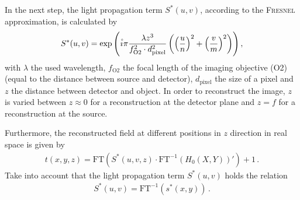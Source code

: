 \documentclass{article}
\newcommand{\ima}[0]{\overset{\hspace{0.5mm}\text{\scalebox{0.7}{$\circ$}}}{\imath}}
\begin{document}
In the next step, the light propagation term $S^*(u,v)$, according to the \textsc{Fresnel} approximation, is calculated by
\begin{align}
    S^*(u,v)=\exp{\left( \ima \pi \frac{\lambda z^3}{f_\text{O2}^2 \cdot d_\text{pixel}^2} \left( \left(\frac{u}{n}\right)^2+\left(\frac{v}{m}\right)^2\right)\right)}\,, \label{eq:propagator}
\end{align}
with $\lambda$ the used wavelength, $f_\text{O2}$ the focal length of the imaging objective (O2) (equal to the distance between source and detector), $d_\text{pixel}$ the size of a pixel and $z$ the distance between detector and object. In order to reconstruct the image, $z$ is varied between $z\approx0$ for a reconstruction at the detector plane and $z=f$ for a reconstruction at the source.

Furthermore, the reconstructed field at different positions in $z$ direction in real space is given by 
\begin{align}
    t(x,y,z)=\text{FT}\left( S^*(u,v,z) \cdot \text{FT}^{-1}\left(H_0(X,Y)\right)'\right)+1\,. \label{eq:field1}
\end{align}
Take into account that the light propagation term $S^*(u,v)$ holds the relation
\begin{align}
    S^*(u,v) =\text{FT}^{-1}\left(s^*(x,y)\right)\,.
\end{align}
\end{document}
